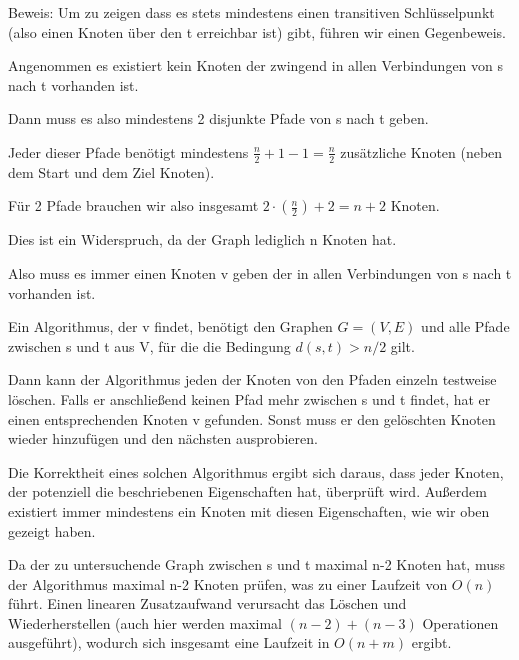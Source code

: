 Beweis:
Um zu zeigen dass es stets mindestens einen transitiven Schlüsselpunkt (also einen Knoten über den t erreichbar ist) gibt, führen wir einen  Gegenbeweis.

Angenommen es existiert kein Knoten der zwingend in allen Verbindungen von s nach t vorhanden ist.

Dann muss es also mindestens 2 disjunkte Pfade von s nach t geben.

Jeder dieser Pfade benötigt mindestens $ \frac{n}{2} +1 -1 = \frac{n}{2} $ zusätzliche Knoten (neben dem Start und dem Ziel Knoten).

Für 2 Pfade brauchen wir also insgesamt $ 2 \cdot (\frac{n}{2}) + 2 = n +2$ Knoten.

Dies ist ein Widerspruch, da der Graph lediglich n Knoten hat.

Also muss es immer einen Knoten v geben der in allen Verbindungen von s nach t vorhanden ist.



Ein Algorithmus, der v findet, benötigt den Graphen $G=(V, E)$ und alle Pfade zwischen s und t aus V, für die die Bedingung $d(s,t) > n/2$ gilt.

Dann kann der Algorithmus jeden der Knoten von den Pfaden einzeln testweise löschen. Falls er anschließend keinen Pfad mehr zwischen s und t findet, hat er einen entsprechenden Knoten v gefunden. Sonst muss er den gelöschten Knoten wieder hinzufügen und den nächsten ausprobieren.

Die Korrektheit eines solchen Algorithmus ergibt sich daraus, dass jeder Knoten, der potenziell die beschriebenen Eigenschaften hat, überprüft wird. Außerdem existiert immer mindestens ein Knoten mit diesen Eigenschaften, wie wir oben gezeigt haben.

Da der zu untersuchende Graph zwischen s und t maximal n-2 Knoten hat, muss der Algorithmus maximal n-2 Knoten prüfen, was zu einer Laufzeit von $O(n)$ führt. Einen linearen Zusatzaufwand verursacht das Löschen und Wiederherstellen (auch hier werden maximal $(n-2)+(n-3)$ Operationen ausgeführt), wodurch sich insgesamt eine Laufzeit in $O(n+m)$ ergibt.

